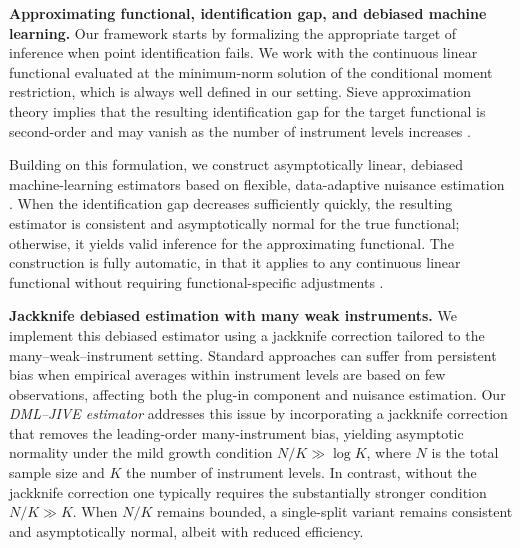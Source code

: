 \documentclass[11pt]{article}
\theoremstyle{plain}
\theoremstyle{definition}
\theoremstyle{remark}
\theoremstyle{definition}
\begin{document}
\medskip
\noindent\textbf{Approximating functional, identification gap, and debiased machine learning.}
Our framework starts by formalizing the appropriate target of inference when
point identification fails. We work with the continuous linear functional
evaluated at the minimum-norm solution of the conditional moment restriction,
which is always well defined in our setting. Sieve approximation theory implies
that the resulting identification gap for the target functional is second-order
and may vanish as the number of instrument levels increases
\citep{carrasco2007linear, babii2020completeness}.



Building on this formulation, we construct asymptotically linear, debiased
machine-learning estimators based on flexible, data-adaptive nuisance
estimation \citep{vanderLaanRose2011, DoubleML}. When the identification gap
decreases sufficiently quickly, the resulting estimator is consistent and
asymptotically normal for the true functional; otherwise, it yields valid
inference for the approximating functional. The construction is fully automatic,
in that it applies to any continuous linear functional without requiring
functional-specific adjustments \citep{chernozhukov2022automatic, van2025automatic2}.

\medskip
\noindent\textbf{Jackknife debiased estimation with many weak instruments.}
We implement this debiased estimator using a jackknife correction tailored to
the many--weak--instrument setting. Standard approaches can suffer from
persistent bias when empirical averages within instrument levels are based on
few observations, affecting both the plug-in component and nuisance estimation.
Our \emph{DML--JIVE estimator} addresses this issue by incorporating a
jackknife correction that removes the leading-order many-instrument bias,
yielding asymptotic normality under the mild growth condition
\(N/K \gg \log K\), where \(N\) is the total sample size and \(K\) the number of
instrument levels. In contrast, without the jackknife correction one typically
requires the substantially stronger condition \(N/K \gg K\). When \(N/K\)
remains bounded, a single-split variant remains consistent and asymptotically
normal, albeit with reduced efficiency.
\end{document}
